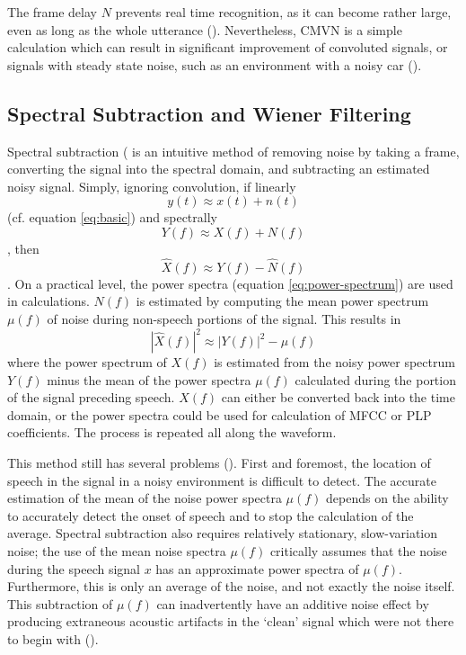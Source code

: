 The frame delay $N$ prevents real time recognition, as it can become rather large, even as long as the whole utterance (\cite{li:14}).  Nevertheless, CMVN is a simple calculation which can result in significant improvement of convoluted signals, or signals with steady state noise, such as an environment with a noisy car (\cite{viikki:98}).

\subsection{Spectral Subtraction and Wiener Filtering}\label{sec:spec-sub_wiener}

Spectral subtraction (\cite{boll:79} is an intuitive method of removing noise by taking a frame, converting the signal into the spectral domain, and subtracting an estimated noisy signal. Simply, ignoring convolution, if linearly \begin{equation} y(t) \approx x(t) + n(t) \end{equation} (cf. equation \ref{eq:basic}) and spectrally \begin{equation} Y(f) \approx X(f) + N(f) \end{equation}, then \begin{equation} \hat{X}(f) \approx Y(f) - \hat{N}(f) \end{equation}.  On a practical level, the power spectra (equation \ref{eq:power-spectrum}) are used in calculations.  $N(f)$ is estimated by computing the mean power spectrum $\mu(f)$ of noise during non-speech portions of the signal.  This results in \begin{equation} |\hat{X}(f)|^2 \approx |Y(f)|^2 - \mu(f) \end{equation} where the power spectrum of $X(f)$ is estimated from the noisy power spectrum $Y(f)$ minus the mean of the power spectra $\mu(f)$ calculated during the portion of the signal preceding speech. $X(f)$ can either be converted back into the time domain, or the power spectra could be used for calculation of MFCC or PLP coefficients.  The process is repeated all along the waveform.

This method still has several problems (\cite{li:14}). First and foremost, the location of speech in the signal in a noisy environment is difficult to detect.  The accurate estimation of the mean of the noise power spectra $\mu(f)$ depends on the ability to accurately detect the onset of speech and to stop the calculation of the average.  Spectral subtraction also requires relatively stationary, slow-variation noise; the use of the mean noise spectra $\mu(f)$ critically assumes that the noise during the speech signal $x$ has an approximate power spectra of $\mu(f)$.  Furthermore, this is only an average of the noise, and not exactly the noise itself.  This subtraction of $\mu(f)$ can inadvertently have an additive noise effect by producing extraneous acoustic artifacts in the `clean' signal which were not there to begin with (\cite{berouti:79}).

